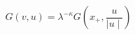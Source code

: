 \begin{equation}
G(v,u) = \lambda^{-\kappa} G(x_{+}, \frac{u}{\mid u\mid})   \label{1.71}
\end{equation}

